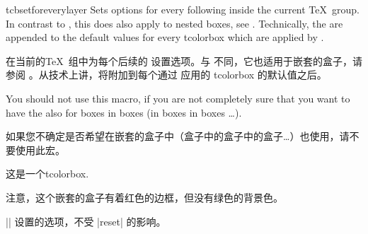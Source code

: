 \begin{docCommand}{tcbsetforeverylayer}{}
Sets options for every following  inside the current \TeX\ group.
In contrast to , this does also
apply to nested boxes, see .
Technically, the  are appended to the default values for every
tcolorbox which are applied by .


在当前的\TeX\ 组中为每个后续的 设置选项。与 不同，它也适用于嵌套的盒子，请参阅 。从技术上讲，将附加到每个通过  应用的 tcolorbox 的默认值之后。%

You should not use this macro, if you are not completely sure that you
want to have the  also for boxes in boxes (in boxes in boxes \ldots).


如果您不确定是否希望在嵌套的盒子中（盒子中的盒子中的盒子\ldots）也使用，请不要使用此宏。
\begin{dispExample}

\begin{tcolorbox}[title=All options for this box]
这是一个tcolorbox.\par\medskip
  \begin{tcolorbox}[title=嵌套的盒子]
    注意，这个嵌套的盒子有着红色的边框，但没有绿色的背景色。
  \end{tcolorbox}
\end{tcolorbox}
\bigskip

\begin{tcolorbox}[reset]
|\tcbsetforeverylayer| 设置的选项，不受 |reset| 的影响。
\end{tcolorbox}
\end{dispExample}
\end{docCommand}
